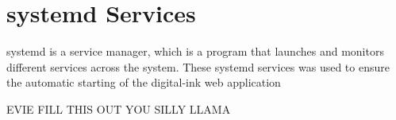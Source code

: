 \section{systemd Services}
systemd is a service manager, which is a program that launches and monitors different services across the system. These
systemd services was used to ensure the automatic starting of the digital-ink web application



EVIE FILL THIS OUT YOU SILLY LLAMA